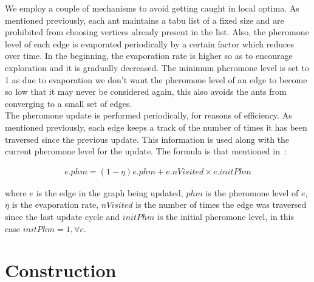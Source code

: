 \begin{spacing}{1.5}
\indent We employ a couple of mechanisms to avoid getting caught in local optima. As mentioned previously, each ant maintains a tabu list of a fixed size and are prohibited from choosing vertices already present in the list. Also, the pheromone level of each edge is evaporated periodically by a certain factor which reduces over time. In the beginning, the evaporation rate is higher so as to encourage exploration and it is gradually decreased. The minimum pheromone level is set to 1 as due to evaporation we don't want the pheromone level of an edge to become so low that it may never be considered again, this also avoids the ants from converging to a small set of edges.\\
\indent The pheromone update is performed periodically, for reasons of efficiency. As mentioned previously, each edge keeps a track of the number of times it has been traversed since the previous update. This information is used along with the current pheromone level for the update. The formula is that mentioned in~\cite{5910378}:

\begin{align}
e.phm = (1 - \eta)e.phm + e.nVisited \times e.initPhm
\end{align}

where $e$ is the edge in the graph being updated, $phm$ is the pheromone level of $e$, $\eta$ is the evaporation rate, $nVisited$ is the number of times the edge was traversed since the last update cycle and $initPhm$ is the initial pheromone level, in this case $initPhm = 1, \forall e$.

\section{Construction}


\end{spacing}
